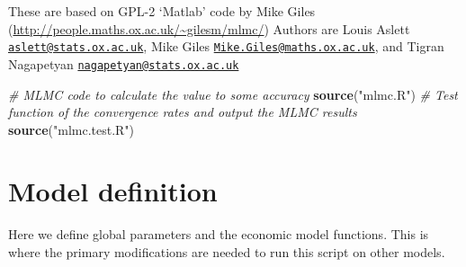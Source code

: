 \documentclass[
]{article}
\newenvironment{Shaded}{\begin{snugshade}}{\end{snugshade}}
\newcommand{\CommentTok}[1]{\textcolor[rgb]{0.56,0.35,0.01}{\textit{#1}}}
\newcommand{\KeywordTok}[1]{\textcolor[rgb]{0.13,0.29,0.53}{\textbf{#1}}}
\newcommand{\NormalTok}[1]{#1}
\newcommand{\StringTok}[1]{\textcolor[rgb]{0.31,0.60,0.02}{#1}}
\begin{document}
These are based on GPL-2 `Matlab' code by Mike Giles
(\url{http://people.maths.ox.ac.uk/~gilesm/mlmc/}) Authors are Louis
Aslett
\href{mailto:aslett@stats.ox.ac.uk}{\nolinkurl{aslett@stats.ox.ac.uk}},
Mike Giles
\href{mailto:Mike.Giles@maths.ox.ac.uk}{\nolinkurl{Mike.Giles@maths.ox.ac.uk}},
and Tigran Nagapetyan
\href{mailto:nagapetyan@stats.ox.ac.uk}{\nolinkurl{nagapetyan@stats.ox.ac.uk}}

\begin{Shaded}
\begin{Highlighting}[]
\CommentTok{# MLMC code to calculate the value to some accuracy}
\KeywordTok{source}\NormalTok{(}\StringTok{"mlmc.R"}\NormalTok{)}
\CommentTok{# Test function of the convergence rates and output the MLMC results}
\KeywordTok{source}\NormalTok{(}\StringTok{"mlmc.test.R"}\NormalTok{) }
\end{Highlighting}
\end{Shaded}

\hypertarget{model-definition}{%
\section{Model definition}\label{model-definition}}

Here we define global parameters and the economic model functions. This
is where the primary modifications are needed to run this script on
other models.
\end{document}
